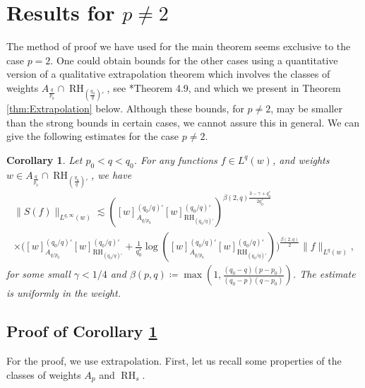 \documentclass[11pt,reqno]{amsart}
\theoremstyle{plain} %
\newtheorem{corollary}[equation]{Corollary}
\newcommand{\1}{ \mathbbm{1}}   %
\theoremstyle{definition}
\theoremstyle{remark}
\numberwithin{equation}{section}
\begin{document}
\section{Results for \texorpdfstring{$p\neq 2$}{p≠2}}
\label{sec:pneq2}

The method of proof we have used for the main theorem seems exclusive to the case $p=2$. One could obtain bounds for the other cases using a quantitative version of a qualitative extrapolation theorem which involves the classes of weights $A_{\frac{q}{p_0}}\cap \operatorname{RH}_{(\frac{q_0}{q})'}$, see \cite{AuscherMartellIGeneral}*{Theorem 4.9}, and which we present in Theorem \ref{thm:Extrapolation} below. Although these bounds, for $p\neq 2$, may be smaller than the strong bounds in certain cases, we cannot assure this in general. We can give the following estimates for the case $p\neq 2$.

\begin{corollary} \label{c.allp}
Let $p_0<q<q_0$. For any functions $f\in L^q(w)$, and weights $w\in A_{\frac{q}{p_0}}\cap \operatorname{RH}_{(\frac{q_0}{q})'}$, we have
\begin{multline*}
\|S(f)\|_{L^{q,\infty}(w)} \lesssim ([w]^{(q_0/q)'}_{A_{q/p_0}}[w]^{(q_0/q)'}_{\operatorname{RH}_{(q_0/q)'}})^{\beta(2,q){\frac{3-\gamma+q_0^*}{ 2q^*_0}}}\\
\times\Big([w]^{(q_0/q)'}_{A_{q/p_0}}[w]^{(q_0/q)'}_{\operatorname{RH}_{(q_0/q)'}}+\frac{1}{q_0^*}\log([w]^{(q_0/q)'}_{A_{q/p_0}}[w]^{(q_0/q)'}_{\operatorname{RH}_{(q_0/q)'}})\Big)^{\frac{\beta(2,q)}{2}}\|f\|_{L^q(w)},
\end{multline*}
for some small $\gamma<1/4$ and $\beta(p,q)\coloneqq \max (1, \frac{(q_{0} - q)(p -
      p_{0})}{(q_{0} - p)(q - p_{0})})$.
The estimate is uniformly in the weight.
\end{corollary}

\subsection{Proof of Corollary \ref{c.allp}}

For the proof, we use extrapolation. First, let us recall some properties of the classes of weights $A_p$ and $\operatorname{RH}_s$.
\end{document}
